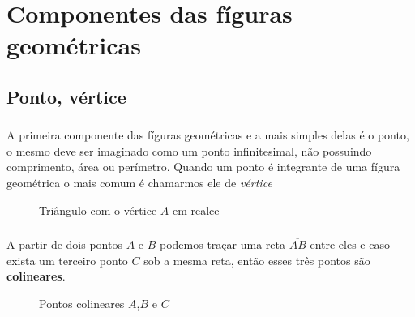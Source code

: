 \documentclass{beamer}
\begin{document}

\section{Componentes das fíguras geométricas}
\subsection{Ponto, vértice}
\begin{frame}\frametitle{\subsecname}
    A primeira componente das fíguras geométricas e a mais simples delas é o ponto, o mesmo deve ser imaginado como um
    ponto infinitesimal, não possuindo comprimento, área ou perímetro. Quando um ponto é integrante de uma fígura
    geométrica o mais comum é chamarmos ele de \textit{vértice}
    \begin{figure}[H]
        \centering
        \caption{Triângulo com o vértice $A$ em realce }
    \end{figure}

\end{frame}

\begin{frame}\frametitle{\subsecname}
    A partir de dois pontos $A$ e $B$ podemos traçar uma reta $\overline{AB}$ entre eles e caso exista um terceiro ponto $C$ sob a mesma reta,
    então esses três pontos são \textbf{colineares}.

    \begin{figure}[H]
        \centering
        \caption{Pontos colineares $A$,$B$ e $C$}
        \label{fig:reta_ab}
    \end{figure}
\end{frame}
\end{document}
